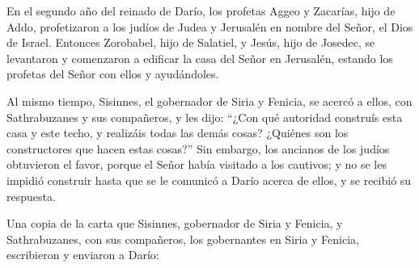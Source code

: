  En el segundo año del reinado de Darío, los profetas
Aggeo y Zacarías, hijo de Addo, profetizaron a los judíos de Judea y
Jerusalén en nombre del Señor, el Dios de Israel. 
Entonces Zorobabel, hijo de Salatiel, y Jesús, hijo de Josedec, se
levantaron y comenzaron a edificar la casa del Señor en Jerusalén,
estando los profetas del Señor con ellos y ayudándoles.

 Al mismo tiempo, Sisinnes, el gobernador de Siria y
Fenicia, se acercó a ellos, con Sathrabuzanes y sus compañeros, y les
dijo:  ``¿Con qué autoridad construís esta casa y este
techo, y realizáis todas las demás cosas? ¿Quiénes son los constructores
que hacen estas cosas?''  Sin embargo, los ancianos de los
judíos obtuvieron el favor, porque el Señor había visitado a los
cautivos;  y no se les impidió construir hasta que se le
comunicó a Darío acerca de ellos, y se recibió su respuesta.

 Una copia de la carta que Sisinnes, gobernador de Siria y
Fenicia, y Sathrabuzanes, con sus compañeros, los gobernantes en Siria y
Fenicia, escribieron y enviaron a Darío:

